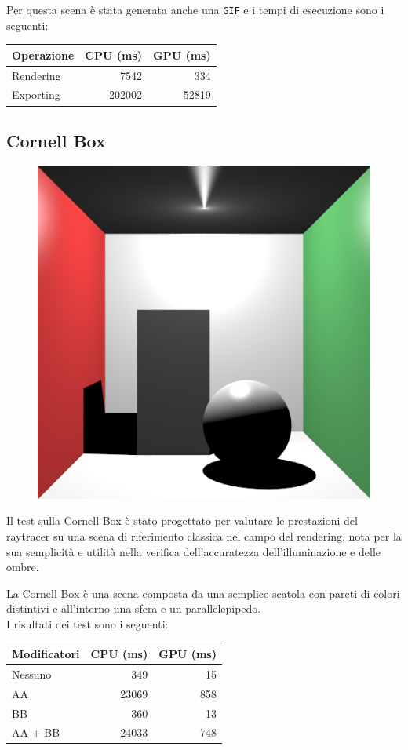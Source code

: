 \documentclass{article}
\begin{document}
Per questa scena è stata generata anche una \texttt{GIF} e i tempi di esecuzione sono i seguenti:

\begin{table}[H]
    \centering
    \begin{tabular}{|l|r|r|}
    \hline
    \textbf{Operazione} & \textbf{CPU (ms)} & \textbf{GPU (ms)} \\ \hline
    Rendering  & 7542   & 334   \\ \hline
    Exporting  & 202002 & 52819 \\ \hline
    \end{tabular}
\end{table}

\subsection{Cornell Box}

\begin{figure}[H]
    \centering
    \includegraphics[width=0.5\linewidth]{cornell_box.png}
    \label{fig:cornell_box}
\end{figure}

Il test sulla Cornell Box\cite{Cornell} è stato progettato per valutare le prestazioni del raytracer su una scena di riferimento classica nel campo del rendering, nota per la sua semplicità e utilità nella verifica dell'accuratezza dell'illuminazione e delle ombre.

La Cornell Box è una scena composta da una semplice scatola con pareti di colori distintivi e all'interno una sfera e un parallelepipedo.\\

I risultati dei test sono i seguenti:

\begin{table}[H]
    \centering
    \begin{tabular}{|l|r|r|}
    \hline
    \textbf{Modificatori} & \textbf{CPU (ms)}   & \textbf{GPU (ms)} \\ \hline
    Nessuno      & 349   & 15  \\ \hline
    AA           & 23069 & 858 \\ \hline
    BB           & 360   & 13  \\ \hline
    AA + BB      & 24033 & 748 \\ \hline
    \end{tabular}
\end{table}
\end{document}
